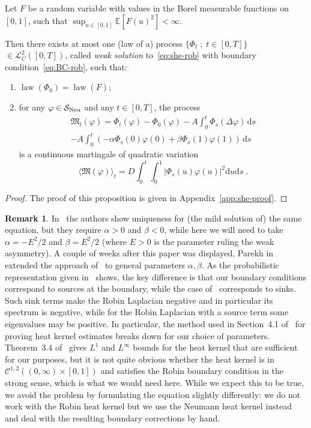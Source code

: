 \documentclass[10pt]{amsart}
\theoremstyle{definition}\newtheorem{defi}[theo]{Definition}\newtheorem{rema}[theo]{Remark}\newtheorem{exam}[theo]{Example}\newtheorem{exem}[theo]{Example}\newtheorem{nota}[theo]{Notation}
\DeclareMathOperator{\Neu}{Neu}
\DeclareMathOperator{\law}{law}
\newcommand{\bb}[1]{{\mathbb #1}}
\newcommand{\mc}[1]{{\mathcal #1}}
\renewcommand{\mc}[1]{{\mathcal #1}}
\newcommand{\SN}{\ensuremath{\mc S_{\Neu}}}
\newcommand*{\dd}{\mathrm{d}}
\newcommand*{\ds}{\dd s}
\newcommand*{\du}{\dd u}
\begin{document}
\begin{prop}\label{def:she-rob}
Let $F$ be a random variable with values in the Borel measurable functions on $[0,1]$, such that $\sup_{u \in [0,1]} \bb E[F(u)^2] < \infty$.

Then there exists at most one (law of a) process $\{\Phi_t\; ; \; t \in [0,T]\}$ $\in \mc L^2_C([0,T])$, called \emph{weak solution} to~\eqref{eq:she-rob} with boundary condition~\eqref{eq:BC-rob}, such that:
\begin{enumerate}
\item \label{3.10.1} $\law(\Phi_0) = \law(F)$;
\item \label{3.10.2} for any $\varphi \in \mc \SN$ and any $t\in[0,T]$, the process
\begin{multline}\label{eq:she-rob-weak}
\mathfrak M_t (\varphi) = \Phi_t(\varphi)- \Phi_0(\varphi) - A \int_0^t \Phi_s(\Delta \varphi)\,\ds\\ - A \int_0^t (- \alpha \Phi_s(0) \varphi(0)+ \beta \Phi_s(1) \varphi(1))\, \ds
\end{multline}
is a continuous martingale of quadratic variation
\[
\big\langle \mathfrak M (\varphi) \big\rangle_t = D \int_0^t \int_0^1 |\Phi_s(u) \varphi(u)|^2 \du \ds\;.
\]
\end{enumerate}
\end{prop}

\begin{proof}
The proof of this proposition is given in Appendix~\ref{app:she-proof}.
\end{proof}

\begin{rema}\label{rmk:CS}
In~\cite[Proposition~2.7]{Corwin2016} the authors show uniqueness for (the mild solution of) the same equation, but they require $\alpha >0$ and $\beta < 0$, while here we will need to take $\alpha = - E^2/2$ and $\beta = E^2/2$ (where $E>0$ is the parameter ruling the weak asymmetry). A couple of weeks after this paper was displayed, Parekh in~\cite{Parekh2017} extended the approach of~\cite{Corwin2016} to general parameters $\alpha,\beta$. As the probabilistic representation given in~\cite{Freidlin1985, Papanicolaou1990} shows, the key difference is that our boundary conditions correspond to sources at the boundary, while the case of~\cite{Corwin2016} corresponds to sinks. Such sink terms make the Robin Laplacian negative and in particular its spectrum is negative, while for the Robin Laplacian with a source term some eigenvalues may be positive. In particular, the method used in Section~4.1 of~\cite{Corwin2016} for proving heat kernel estimates breaks down for our choice of parameters. Theorem~3.4 of~\cite{Papanicolaou1990} gives $L^1$ and $L^\infty$ bounds for the heat kernel that are sufficient for our purposes, but it is not quite obvious whether the heat kernel is in $\mc C^{1,2}((0,\infty) \times [0,1])$ and satisfies the Robin boundary condition in the strong sense, which is what we would need here. While we expect this to be true, we avoid the problem by formulating the equation slightly differently: we do not work with the Robin heat kernel but we use the Neumann heat kernel instead and deal with the resulting boundary corrections by hand.
\end{rema}
\end{document}
